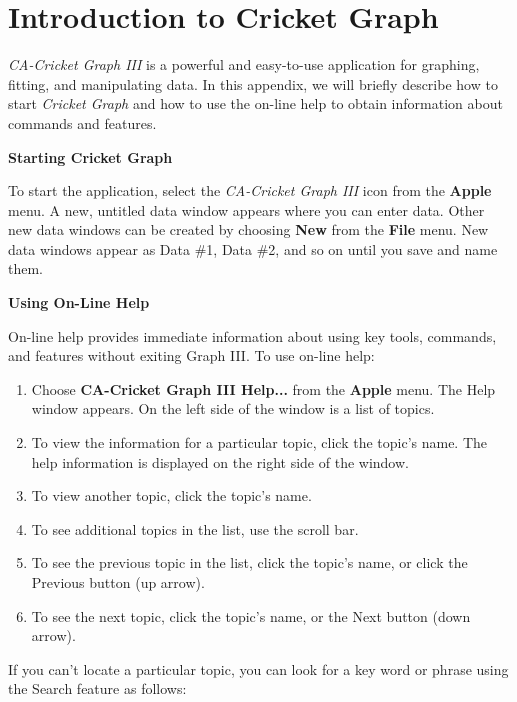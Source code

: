 
\section{Introduction to Cricket Graph}

\textit{CA-Cricket Graph III} is a powerful and easy-to-use application
for graphing, fitting, and manipulating data. In this appendix, we
will briefly describe how to start \textit{Cricket Graph} and how
to use the on-line help to obtain information about commands and features.

\textbf{Starting Cricket Graph }

To start the application, select the \textit{CA-Cricket Graph III}
icon from the \textbf{Apple} menu. A new, untitled data window appears
where you can enter data. Other new data windows can be created by
choosing \textbf{New} from the \textbf{File} menu. New data windows
appear as Data \#1, Data \#2, and so on until you save and name them.

\textbf{Using On-Line Help} 

On-line help provides immediate information about using key tools,
commands, and features without exiting Graph III. To use on-line help: 

\begin{enumerate}
\item Choose \textbf{CA-Cricket Graph III Help...} from the \textbf{Apple}
menu. The Help window appears. On the left side of the window is a
list of topics. 
\item To view the information for a particular topic, click the topic's
name. The help information is displayed on the right side of the window. 
\item To view another topic, click the topic's name. 
\item To see additional topics in the list, use the scroll bar. 
\item To see the previous topic in the list, click the topic's name, or
click the Previous button (up arrow). 
\item To see the next topic, click the topic's name, or the Next button
(down arrow).
\end{enumerate}
If you can't locate a particular topic, you can look for a key word
or phrase using the Search feature as follows: 

